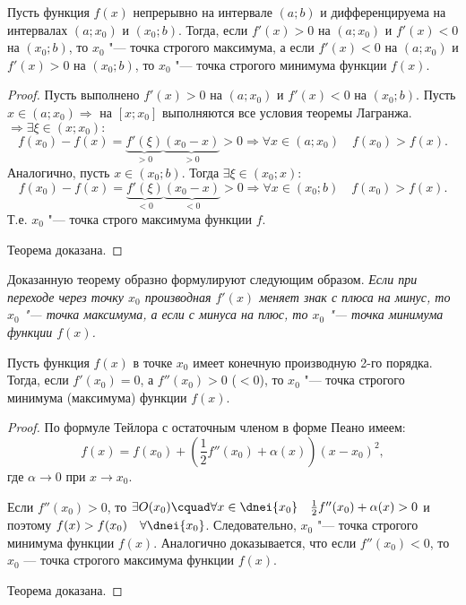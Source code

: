 \begin{thm} Пусть функция $f(x)$ непрерывно на интервале $(a;b)$ и дифференцируема на интервалах $(a;x_0)$ и $(x_0;b)$. Тогда, если $f'(x) > 0$ на $(a;x_0)$ и $f'(x) < 0$ на $(x_0;b)$, то $x_0$ "--- точка строгого максимума, а если $f'(x) < 0$ на $(a;x_0)$ и $f'(x) > 0$ на $(x_0;b)$, то $x_0$ "--- точка строгого минимума функции $f(x)$.
\end{thm}
\begin{proof}
Пусть выполнено $f'(x) > 0$ на $(a;x_0)$ и $f'(x) < 0$ на $(x_0;b)$. Пусть $x \in (a;x_0) \Rightarrow$ на $[x;x_0]$ выполняются все условия теоремы Лагранжа. $\Rightarrow \exists \xi \in (x;x_0):$ 
$$
f(x_0)-f(x) = \underbrace{f'(\xi)}_{>0} \underbrace{(x_0-x)}_{>0} >0 \Rightarrow \forall x \in (a;x_0)\quad f(x_0) > f(x).
$$
Аналогично, пусть $x\in(x_0;b)$. Тогда $\exists \xi \in (x_0;x):$
$$
f(x_0)-f(x) = \underbrace{f'(\xi)}_{<0} \underbrace{(x_0-x)}_{<0} >0 \Rightarrow \forall x \in (x_0;b) \quad f(x_0) > f(x).
$$
Т.е. $x_0$ "--- точка строго максимума функции $f$.

Теорема доказана.
\end{proof}
Доказанную теорему образно формулируют следующим образом. \textit{Если при переходе через точку $x_0$ производная $f'(x)$ меняет знак с плюса на минус, то $x_0$ "--- точка максимума, а если с минуса на плюс, то $x_0$ "--- точка минимума функции $f(x)$.}
\begin{thm}  Пусть функция $f(x)$ в точке $x_0$ имеет конечную производную 2-го порядка. Тогда, если $f'(x_0) = 0$, а $f''(x_0) > 0$ \textup{($<0$)}, то $x_0$ "--- точка строгого минимума (максимума) функции $f(x)$.
\end{thm}

\begin{proof}
По формуле Тейлора с остаточным членом в форме Пеано имеем:	
$$
f(x)=f(x_0)+\left(\frac{1}{2}f''(x_0)+\alpha(x)\right)(x-x_0)^2,
$$
где $\alpha \to 0$ при $x \to x_0$.
 
Если $f''(x_0) > 0$, то $\exists O(x_0)\cquad \forall x\in\dnei{x_0}\quad\frac{1}{2}f''(x_0)+\alpha(x)>0$
и поэтому $f(x) > f(x_0)\quad \forall \dnei{x_0}$. Следовательно, $x_0$ "--- точка строгого минимума функции $f(x)$.
Аналогично доказывается, что если $ f''(x_0) < 0$, то $x_0$ — точка строгого максимума функции $f(x)$.

Теорема доказана.
\end{proof}



